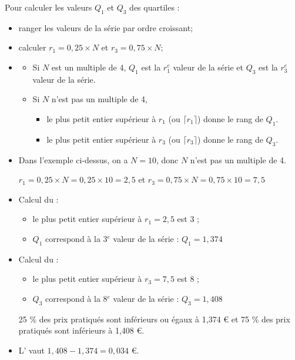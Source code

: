 \documentclass[12pt,a4paper]{article}
\begin{document}
\begin{mymeth}
	Pour calculer les valeurs $Q_1$ et $Q_3$ des quartiles :
	\begin{itemize}
		\item ranger les valeurs de la série par ordre croissant;
		\item calculer $r_1 = 0,25 \times N$ et $r_3 = 0,75 \times N$;
		\item \begin{itemize}
				\item Si $N$ est un multiple de 4, $Q_1$ est la $r_1^e$ valeur de la série et $Q_3$ est la $r_3^e$ valeur de la série.
				\item Si $N$ n'est pas un multiple de 4, \begin{itemize}
					\item le plus petit entier supérieur à $r_1$ (ou $ \lceil r_1\rceil$) donne le rang de $Q_1$.
					\item le plus petit entier supérieur à $r_3$ (ou $\lceil r_3\rceil$) donne le rang de $Q_3$.
					
				\end{itemize}
			\end{itemize}
	\end{itemize}
\end{mymeth}

\begin{myex}
	
	
	\begin{itemize}		

		\item Dans l'exemple ci-dessus, on a $N = 10$, donc $N$ n'est pas un multiple de 4.
		
		$r_1 = 0,25 \times N = 0,25 \times 10 = 2,5$ et $ r_3 = 0,75 \times N = 0,75 \times 10 = 7,5 $
		

		\item Calcul du  :
		\begin{itemize}
			\item le plus petit entier supérieur à $r_1 = 2,5$ est 3 ;
			\item $Q_1$ correspond à la 3$^e$ valeur de la série : $Q_1 = 1,374$
		\end{itemize}
		
		\item Calcul du  :
		\begin{itemize}
			\item le plus petit entier supérieur à $r_3 = 7,5$ est 8 ;
			\item $Q_3$ correspond à la 8$^e$ valeur de la série : $Q_3 = 1,408$
		\end{itemize}
		
		25 \% des prix pratiqués sont inférieurs ou égaux à 1,374 € et 75 \% des prix pratiqués sont inférieurs à 1,408 €.
		
		
		\item L' vaut $1,408 - 1,374 = 0,034$ €.
	\end{itemize}
\end{myex}
\end{document}
